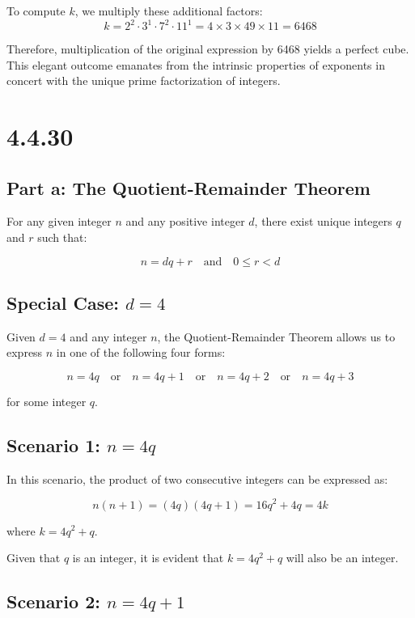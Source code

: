 \documentclass[12pt]{article}
\begin{document}
To compute \(k\), we multiply these additional factors:
\[
k = 2^2 \cdot 3^1 \cdot 7^2 \cdot 11^1 = 4 \times 3 \times 49 \times 11 = 6468
\]

Therefore, multiplication of the original expression by 6468 yields a perfect cube. This elegant outcome emanates from the intrinsic properties of exponents in concert with the unique prime factorization of integers.

\newpage

\section{4.4.30}

\subsection{Part a: The Quotient-Remainder Theorem}

For any given integer \( n \) and any positive integer \( d \), there exist unique integers \( q \) and \( r \) such that:

\[
n = dq + r \quad \text{and} \quad 0 \leq r < d
\]

\subsection{Special Case: \( d = 4 \)}

Given \( d = 4 \) and any integer \( n \), the Quotient-Remainder Theorem allows us to express \( n \) in one of the following four forms:

\[
n = 4q \quad \text{or} \quad n = 4q + 1 \quad \text{or} \quad n = 4q + 2 \quad \text{or} \quad n = 4q + 3
\]

for some integer \( q \).

\subsection{Scenario 1: \( n = 4q \)}

In this scenario, the product of two consecutive integers can be expressed as:

\[
n(n + 1) = (4q)(4q + 1) = 16q^2 + 4q = 4k
\]

where \( k = 4q^2 + q \).

Given that \( q \) is an integer, it is evident that \( k = 4q^2 + q \) will also be an integer.

\subsection{Scenario 2: \( n = 4q + 1 \)}
\end{document}
